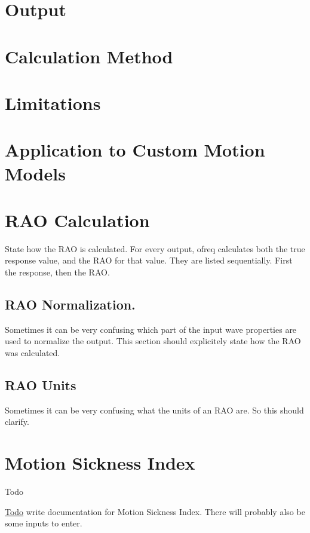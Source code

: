 \section*{Output}

\section*{Calculation Method}

\section*{Limitations}

\section*{Application to Custom Motion Models}

\section*{R\-A\-O Calculation}

State how the R\-A\-O is calculated. For every output, ofreq calculates both the true response value, and the R\-A\-O for that value. They are listed sequentially. First the response, then the R\-A\-O.

\subsection*{R\-A\-O Normalization.}

Sometimes it can be very confusing which part of the input wave properties are used to normalize the output. This section should explicitely state how the R\-A\-O was calculated.

\subsection*{R\-A\-O Units}

Sometimes it can be very confusing what the units of an R\-A\-O are. So this should clarify. \hypertarget{local_msi}{}\section{Motion Sickness Index}\label{local_msi}
\begin{DoxyRefDesc}{Todo}
\item[\hyperlink{todo__todo000021}{Todo}]write documentation for Motion Sickness Index. There will probably also be some inputs to enter.\end{DoxyRefDesc}


